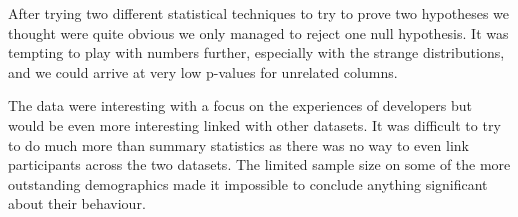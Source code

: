 \documentclass[journal,12pt,onecolumn,]{IEEEtran}
\begin{document}
After trying two different statistical techniques to try to prove two hypotheses we thought were quite obvious we only managed to reject one null hypothesis.
It was tempting to play with numbers further, especially with the strange distributions, and we could arrive at very low p-values for unrelated columns.

The data were interesting with a focus on the experiences of developers but would be even more interesting linked with other datasets.
It was difficult to try to do much more than summary statistics as there was no way to even link participants across the two datasets.
The limited sample size on some of the more outstanding demographics made it impossible to conclude anything significant about their behaviour.



\end{document}
